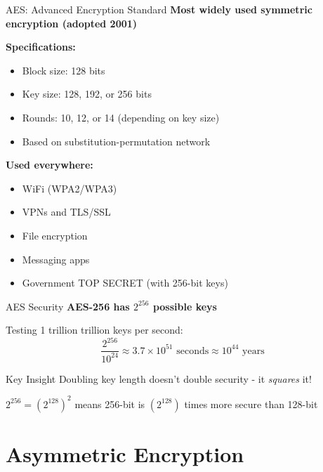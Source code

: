 \documentclass{beamer}
\begin{document}
\begin{frame}{AES: Advanced Encryption Standard}
\textbf{Most widely used symmetric encryption (adopted 2001)}

\vspace{0.3cm}
\textbf{Specifications:}
\begin{itemize}
    \item Block size: 128 bits
    \item Key size: 128, 192, or 256 bits
    \item Rounds: 10, 12, or 14 (depending on key size)
    \item Based on substitution-permutation network
\end{itemize}

\vspace{0.3cm}
\textbf{Used everywhere:}
\begin{itemize}
    \item WiFi (WPA2/WPA3)
    \item VPNs and TLS/SSL
    \item File encryption
    \item Messaging apps
    \item Government TOP SECRET (with 256-bit keys)
\end{itemize}

\end{frame}

\begin{frame}{AES Security}
\textbf{AES-256 has $2^{256}$ possible keys}

\vspace{0.3cm}
Testing 1 trillion trillion keys per second:
\[
\frac{2^{256}}{10^{24}} \approx 3.7 \times 10^{51} \text{ seconds} \approx 10^{44} \text{ years}
\]

\vspace{0.3cm}
\begin{alertblock}{Key Insight}
Doubling key length doesn't double security - it \emph{squares} it!

$2^{256} = (2^{128})^2$ means 256-bit is $(2^{128})$ times more secure than 128-bit
\end{alertblock}
\end{frame}

\section{Asymmetric Encryption}
\end{document}
